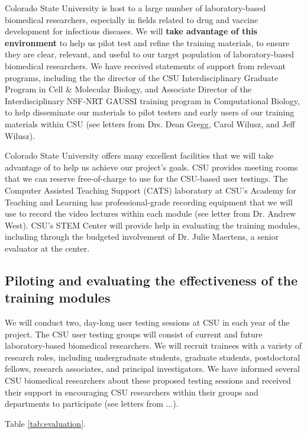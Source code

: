 \documentclass[pdftex,english,11pt,parskip=half]{scrartcl}
\begin{document}
Colorado State University is host to a large number of laboratory-based biomedical researchers, especially in fields related to drug and vaccine development for infectious diseases. We will \textbf{take advantage of this environment} to help us pilot test and refine the training materials, to ensure they are clear, relevant, and useful to our target population of laboratory-based biomedical researchers. We have received statements of support from relevant programs, including the the director of the CSU 
Interdisciplinary Graduate Program in Cell \& Molecular Biology, and Associate Director of the Interdisciplinary NSF-NRT GAUSSI training program in Computational Biology, to help disseminate our materials to pilot testers and early users of our training materials within CSU (see letters from Drs. Dean Gregg, Carol Wilusz, and Jeff Wilusz). 

Colorado State University offers many excellent facilities that we will take advantage of to help us achieve our project's goals. CSU provides meeting rooms that we can reserve free-of-charge to use for the CSU-based user testings. The Computer Assisted Teaching Support (CATS) laboratory at CSU's Academy for Teaching and Learning has professional-grade recording equipment that we will use to record the video lectures within each module (see letter from Dr. Andrew West). CSU's STEM Center will provide help in evaluating the training modules, including through the budgeted involvement of Dr. Julie Maertens, a senior evaluator at the center. 

\subsection{Piloting and evaluating the effectiveness of the training modules}

We will conduct two, day-long user testing sessions at CSU in each year of the project. The CSU user testing groups will consist of current and future laboratory-based biomedical researchers. We will recruit trainees with a variety of research roles, including undergraduate students, graduate students, postdoctoral fellows, research associates, and principal investigators. We have informed several CSU biomedical researchers about these proposed testing sessions and received their support in encouraging CSU researchers within their groups and departments to participate (see letters from ...). 

Table \ref{tab:evaluation}.
\end{document}
